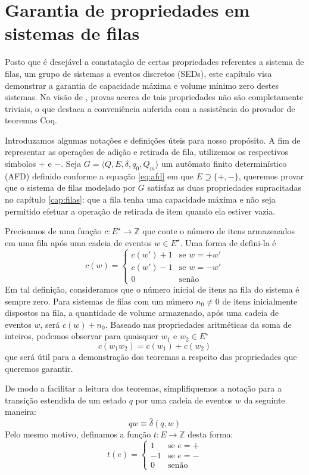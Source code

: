 \chapter{Garantia de propriedades em sistemas de filas}
\label{cap:propriedades}

Posto que é desejável a constatação de certas propriedades referentes a sistema de filas, um grupo de sistemas a eventos discretos (SEDs), este capítulo visa demonstrar a garantia de capacidade máxima e volume mínimo zero destes sistemas. Na visão de , provas acerca de tais propriedades não são completamente triviais, o que destaca a conveniência auferida com a assistência do provador de teoremas Coq.

Introduzamos algumas notações e definições úteis para nosso propósito. A fim de representar as operações de adição e retirada de fila, utilizemos os respectivos símbolos $+$ e $-$. Seja $G = \langle Q, E, \delta, q_0, Q_m \rangle$ um autômato finito determinístico (AFD) definido conforme a equação \ref{eq:afd} em que $E \supseteq \{ +, - \}$, queremos provar que o sistema de filas modelado por $G$ satisfaz as duas propriedades supracitadas no capítulo \ref{cap:filas}: que a fila tenha uma capacidade máxima e não seja permitido efetuar a operação de retirada de item quando ela estiver vazia.

Precisamos de uma função $c : E^\star \to \mathbb{Z}$ que conte o número de itens armazenados em uma fila após uma cadeia de eventos $w \in E^\star$. Uma forma de defini-la é $$c(w) = \begin{cases}
c(w') + 1 & \text{se $w=+w'$}\\
c(w') - 1 & \text{se $w=-w'$}\\
0 & \text{senão}
\end{cases}$$ Em tal definição, consideramos que o número inicial de itens na fila do sistema é sempre zero. Para sistemas de filas com um número $n_0 \neq 0$ de itens inicialmente dispostos na fila, a quantidade de volume armazenado, após uma cadeia de eventos $w$, será $c(w) + n_0$. Baseado nas propriedades aritméticas da soma de inteiros, podemos observar para quaisquer $w_1$ e $w_2 \in E^\star$ $$c(w_1w_2) = c(w_1) + c(w_2)$$ que será útil para a demonstração dos teoremas a respeito das propriedades que queremos garantir.

De modo a facilitar a leitura dos teoremas, simplifiquemos a notação para a transição estendida de um estado $q$ por uma cadeia de eventos $w$ da seguinte maneira: $$qw \equiv \hat{\delta}(q,w)$$ Pelo mesmo motivo, definamos a função $t : E \to \mathbb{Z}$ desta forma: $$t(e) = \begin{cases}
1 & \text{se $e=+$} \\
-1 & \text{se $e=-$} \\
0 & \text{senão}
\end{cases}$$

